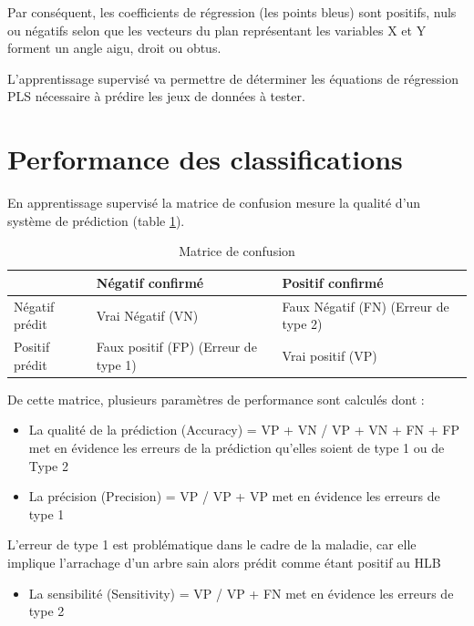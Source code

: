 \documentclass[
  11pt,
  french,
  a4paper,
  extrafontsizes,onecolumn,openright
  ]{memoir}
\providecommand{\tightlist}{%
  \setlength{\itemsep}{0pt}\setlength{\parskip}{0pt}}
\begin{document}
\normalsize

Par conséquent, les coefficients de régression (les points bleus) sont positifs, nuls ou négatifs selon
que les vecteurs du plan représentant les variables X et Y forment un angle aigu, droit ou obtus.

L'apprentissage supervisé va permettre de déterminer les équations de régression PLS nécessaire à prédire les jeux de données à tester.

\vfill
\newpage

\hypertarget{performance-des-classifications}{%
\section{Performance des classifications}\label{performance-des-classifications}}

En apprentissage supervisé la matrice de confusion mesure la qualité d'un système de prédiction (table \ref{tab:MC}).

\scriptsize

\begin{longtable}[t]{lll}
\caption{\label{tab:MC}Matrice de confusion}\\
\toprule
  & Négatif confirmé & Positif confirmé\\
\midrule
Négatif prédit & Vrai Négatif (VN) & Faux Négatif (FN) (Erreur de type 2)\\
Positif prédit & Faux positif (FP) (Erreur de type 1) & Vrai positif (VP)\\
\bottomrule
\end{longtable}

\normalsize

De cette matrice, plusieurs paramètres de performance sont calculés dont :

\begin{itemize}
\item
  La qualité de la prédiction (Accuracy) = VP + VN / VP + VN + FN + FP met en évidence les erreurs de la prédiction qu'elles soient de type 1 ou de Type 2
\item
  La précision (Precision) = VP / VP + VP met en évidence les erreurs de type 1
\end{itemize}

L'erreur de type 1 est problématique dans le cadre de la maladie, car elle implique l'arrachage d'un arbre sain alors prédit comme étant positif au HLB

\begin{itemize}
\tightlist
\item
  La sensibilité (Sensitivity) = VP / VP + FN met en évidence les erreurs de type 2
\end{itemize}
\end{document}
